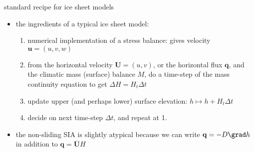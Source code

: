 \begin{frame}{standard recipe for ice sheet models}

\begin{itemize}
\item the ingredients of a typical ice sheet model:
  \begin{enumerate}
  \item numerical implementation of a stress balance: gives velocity $\mathbf{u}=(u,v,w)$
  \item from the horizontal velocity $\mathbf{U}=(u,v)$, or the horizontal flux $\mathbf{q}$, and the climatic mass (surface) balance $M$, do a time-step of the mass continuity equation to get $\Delta H = H_t \Delta t$
  \item update upper (and perhaps lower) surface elevation: $h \mapsto h+H_t \Delta t$
  \item decide on next time-step $\Delta t$, and repeat at 1.
  \end{enumerate}

\vspace{5mm}
\item the non-sliding SIA is slightly atypical because we can write $\mathbf{q} = - D \grad h$ in addition to $\mathbf{q} = \overline{\mathbf{U}}H$
\end{itemize}
\end{frame}
